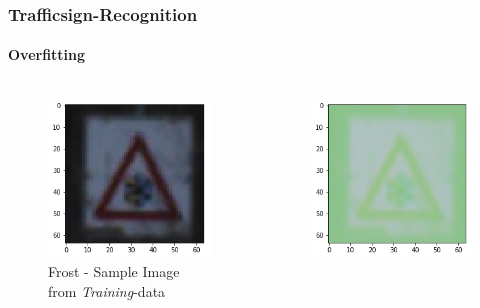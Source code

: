 \begin{frame}
	\frametitle{Trafficsign-Recognition}
	\framesubtitle{Overfitting}
	\begin{columns}
		\begin{column}{0.33\textwidth}
			\begin{center}
				\begin{figure}
					\includegraphics[width=0.9\linewidth]{Images/Frost}
					\caption[Frost]{Frost - Sample Image from \textit{Training}-data}
					\label{fig:frost}
				\end{figure}
			\end{center}		
		\end{column}
		\begin{column}{0.33\textwidth}
			\begin{center}
				\begin{figure}
					\includegraphics[width=0.9\linewidth]{Images/FrostOverfitting}

\end{figure}
\end{center}
\end{column}
\end{columns}
\end{frame}
